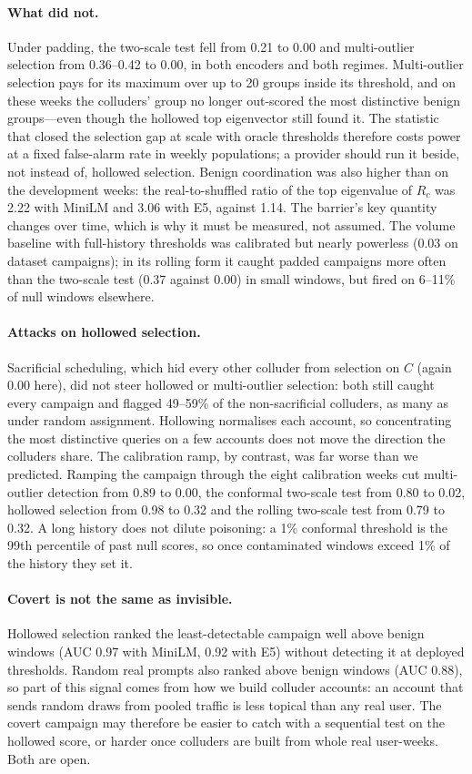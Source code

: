 \paragraph{What did not.} Under padding, the two-scale test fell from 0.21 to 0.00 and multi-outlier selection from 0.36--0.42 to 0.00, in both encoders and both regimes. Multi-outlier selection pays for its maximum over up to 20 groups inside its threshold, and on these weeks the colluders' group no longer out-scored the most distinctive benign groups---even though the hollowed top eigenvector still found it. The statistic that closed the selection gap at scale with oracle thresholds therefore costs power at a fixed false-alarm rate in weekly populations; a provider should run it beside, not instead of, hollowed selection. Benign coordination was also higher than on the development weeks: the real-to-shuffled ratio of the top eigenvalue of $R_c$ was 2.22 with MiniLM and 3.06 with E5, against 1.14. The barrier's key quantity changes over time, which is why it must be measured, not assumed. The volume baseline with full-history thresholds was calibrated but nearly powerless (0.03 on dataset campaigns); in its rolling form it caught padded campaigns more often than the two-scale test (0.37 against 0.00) in small windows, but fired on 6--11\% of null windows elsewhere.

\paragraph{Attacks on hollowed selection.} Sacrificial scheduling, which hid every other colluder from selection on $C$ (again 0.00 here), did not steer hollowed or multi-outlier selection: both still caught every campaign and flagged 49--59\% of the non-sacrificial colluders, as many as under random assignment. Hollowing normalises each account, so concentrating the most distinctive queries on a few accounts does not move the direction the colluders share. The calibration ramp, by contrast, was far worse than we predicted. Ramping the campaign through the eight calibration weeks cut multi-outlier detection from 0.89 to 0.00, the conformal two-scale test from 0.80 to 0.02, hollowed selection from 0.98 to 0.32 and the rolling two-scale test from 0.79 to 0.32. A long history does not dilute poisoning: a 1\% conformal threshold is the 99th percentile of past null scores, so once contaminated windows exceed 1\% of the history they set it.

\paragraph{Covert is not the same as invisible.} Hollowed selection ranked the least-detectable campaign well above benign windows (AUC 0.97 with MiniLM, 0.92 with E5) without detecting it at deployed thresholds. Random real prompts also ranked above benign windows (AUC 0.88), so part of this signal comes from how we build colluder accounts: an account that sends random draws from pooled traffic is less topical than any real user. The covert campaign may therefore be easier to catch with a sequential test on the hollowed score, or harder once colluders are built from whole real user-weeks. Both are open.


